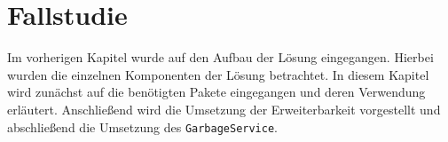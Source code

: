 \chapter{Fallstudie}
\label{ch:fallstudie}
Im vorherigen Kapitel wurde auf den Aufbau der Lösung eingegangen. Hierbei wurden die einzelnen Komponenten der Lösung betrachtet. In diesem Kapitel wird zunächst auf die benötigten Pakete eingegangen und deren Verwendung erläutert. Anschließend wird die  Umsetzung der Erweiterbarkeit vorgestellt und abschließend die Umsetzung des \lstinline{GarbageService}.